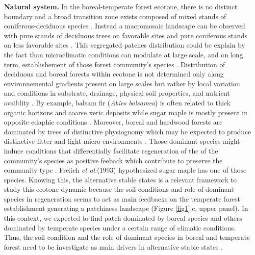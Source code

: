 \textbf{Natural system.} In the boreal-temperate forest ecotone, there is no
distinct boundary and a broad transition zone exists composed of mixed stands
of coniferous-deciduous species \cite{Goldblum2010}. Instead a macromosaic
landscape can be observed with pure stands of deciduous trees on favorable
sites and pure coniferous stands on less favorable sites \cite{Goldblum2010}.
This segregated patches distribution could be explain by the fact than
microclimatic conditions can modulate at large scale, and on long term,
establishement of those forest community's species \cite{DeFrenne2013}.
Distribution of deciduous and boreal forests within ecotone is not determined
only along environnemental gradients present on large scales but rather by
local variation and conditions in substrate, drainage, physical soil
properties, and nutrient avaiblity \cite{Goldblum2010,Society2014}.  By
example, balsam fir (\textit{Abies balsamea}) is often related to thick
organic horizons and coarse xeric deposits while sugar maple is mostly present
in opposite edaphic conditions \cite{Messaoud2007,Kellman2004,Barras1998}.
Moreover, boreal and hardwood forests are dominated by trees of distinctive
physiognomy which may be expected to produce distinctive litter and light
micro-environments \cite{Barras1998}. Those dominant species might induce
conditions that differentially facilitate regeneration of the of the
community’s species as positive feeback which contribute to preserve the
community type \cite{Barras1998}. Frelich \textit{et al.}(1993)
\cite{Society2014} hypothesized sugar maple has one of those species.  Knowing
this, the alternative stable states is a relevant framework to study this
ecotone dynamic because the soil conditions and role of dominant species in
regeneration seems to act as main feedbacks on the temperate forest
establishment generating a patchiness landscape (Figure \ref{fig1}.c, upper
panel). In this context, we expected to find patch dominated by boreal species
and others dominated by temperate species under a certain range of climatic
conditions. Thus, the soil condition and the role of dominant species in
boreal and temperate forest need to be investigate as main drivers in
alternative stable states
\cite{Kellman2004,Moore2008,DeFrenne2013,Barras1998}.


